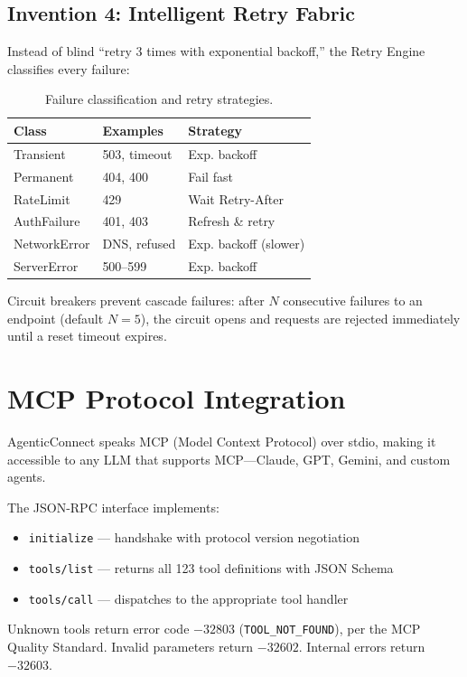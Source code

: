 \documentclass[10pt,twocolumn]{article}
\begin{document}
\subsection{Invention 4: Intelligent Retry Fabric}

Instead of blind ``retry 3 times with exponential backoff,'' the Retry Engine classifies every failure:

\begin{table}[h]
\centering
\caption{Failure classification and retry strategies.}
\label{tab:retry}
\begin{tabular}{@{}lll@{}}
\toprule
\textbf{Class} & \textbf{Examples} & \textbf{Strategy} \\
\midrule
Transient & 503, timeout & Exp. backoff \\
Permanent & 404, 400 & Fail fast \\
RateLimit & 429 & Wait Retry-After \\
AuthFailure & 401, 403 & Refresh \& retry \\
NetworkError & DNS, refused & Exp. backoff (slower) \\
ServerError & 500--599 & Exp. backoff \\
\bottomrule
\end{tabular}
\end{table}

Circuit breakers prevent cascade failures: after $N$ consecutive failures to an endpoint (default $N=5$), the circuit opens and requests are rejected immediately until a reset timeout expires.

\section{MCP Protocol Integration}

AgenticConnect speaks MCP (Model Context Protocol) over stdio, making it accessible to any LLM that supports MCP—Claude, GPT, Gemini, and custom agents.

The JSON-RPC interface implements:
\begin{itemize}
    \item \texttt{initialize} — handshake with protocol version negotiation
    \item \texttt{tools/list} — returns all 123 tool definitions with JSON Schema
    \item \texttt{tools/call} — dispatches to the appropriate tool handler
\end{itemize}

Unknown tools return error code $-32803$ (\texttt{TOOL\_NOT\_FOUND}), per the MCP Quality Standard. Invalid parameters return $-32602$. Internal errors return $-32603$.
\end{document}
